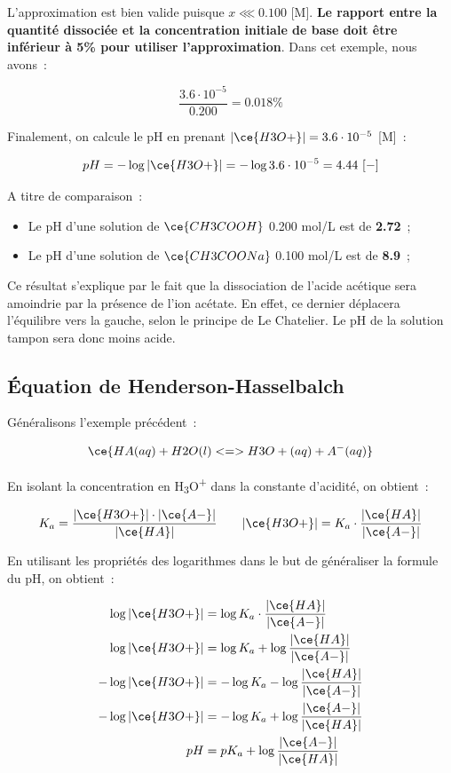 \documentclass[
  11pt,
  a4paper,
  openany]{book}
\providecommand{\tightlist}{%
  \setlength{\itemsep}{0pt}\setlength{\parskip}{0pt}}
\begin{document}
L'approximation est bien valide puisque \(x \lll 0.100\) {[}M{]}. \textbf{Le rapport entre la quantité dissociée et la concentration initiale de base doit être inférieur à 5\% pour utiliser l'approximation}. Dans cet exemple, nous avons~:

\[
\frac{3.6 \cdot 10^{-5}}{0.200} = 0.018\%
\]

Finalement, on calcule le pH en prenant \(|\ce{H3O+}| = 3.6 \cdot 10^{-5}\) {[}M{]}~:

\[
pH = - \log |\ce{H3O+}| = - \log 3.6 \cdot 10^{-5} = 4.44\ [-]
\]

A titre de comparaison~:

\begin{itemize}
\tightlist
\item
  Le pH d'une solution de \(\ce{CH3COOH}\) 0.200 mol/L est de \textbf{2.72}~;
\item
  Le pH d'une solution de \(\ce{CH3COONa}\) 0.100 mol/L est de \textbf{8.9}~;
\end{itemize}

Ce résultat s'explique par le fait que la dissociation de l'acide acétique sera amoindrie par la présence de l'ion acétate. En effet, ce dernier déplacera l'équilibre vers la gauche, selon le principe de Le Chatelier. Le pH de la solution tampon sera donc moins acide.

\hypertarget{uxe9quation-de-henderson-hasselbalch}{%
\subsection{Équation de Henderson-Hasselbalch}\label{uxe9quation-de-henderson-hasselbalch}}

Généralisons l'exemple précédent~:

\[
\ce{HA(aq) + H2O(l) <=> H3O+(aq) + A^{-}(aq)}
\]

En isolant la concentration en H\textsubscript{3}O\textsuperscript{+} dans la constante d'acidité, on obtient~:

\[
\begin{split}
K_a = \frac{|\ce{H3O+}| \cdot |\ce{A-}|}{|\ce{HA}|}
\end{split}
\qquad
\begin{split}
|\ce{H3O+}| = K_a \cdot \frac{|\ce{HA}|}{|\ce{A-}|}
\end{split}
\]

En utilisant les propriétés des logarithmes dans le but de généraliser la formule du pH, on obtient~:

\[
\begin{split}
\log |\ce{H3O+}| &= \log K_a \cdot \frac{|\ce{HA}|}{|\ce{A-}|} \\
\log |\ce{H3O+}| &= \log K_a + \log \frac{|\ce{HA}|}{|\ce{A-}|} \\
- \log |\ce{H3O+}| &= - \log K_a - \log \frac{|\ce{HA}|}{|\ce{A-}|} \\
- \log |\ce{H3O+}| &= - \log K_a + \log \frac{|\ce{A-}|}{|\ce{HA}|} \\
pH &= pK_a + \log \frac{|\ce{A-}|}{|\ce{HA}|}
\end{split}
\]
\end{document}
